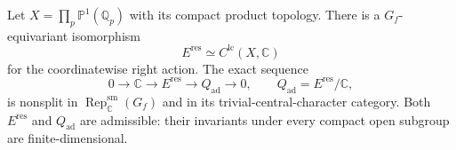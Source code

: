 \begin{proposition}\label{v4-arith:w10-d:adelic:prop:global}
Let $X=\prod_p\mathbb P^1(\mathbb Q_p)$ with its compact product topology.
There is a $G_f$-equivariant isomorphism
\[
 E^{\mathrm{res}}\simeq C^{\mathrm{lc}}(X,\mathbb C)
\]
for the coordinatewise right action. The exact sequence
\begin{equation}\label{v4-arith:w10-d:adelic:eq:global}
 0\longrightarrow\mathbb C\longrightarrow E^{\mathrm{res}}
       \longrightarrow Q_{\mathrm{ad}}\longrightarrow0,
 \qquad Q_{\mathrm{ad}}=E^{\mathrm{res}}/\mathbb C,
\end{equation}
is nonsplit in $\operatorname{Rep}^{\mathrm{sm}}_{\mathbb C}(G_f)$ and in its trivial-central-character category.
Both $E^{\mathrm{res}}$ and $Q_{\mathrm{ad}}$ are admissible: their invariants under
every compact open subgroup are finite-dimensional.
\end{proposition}
